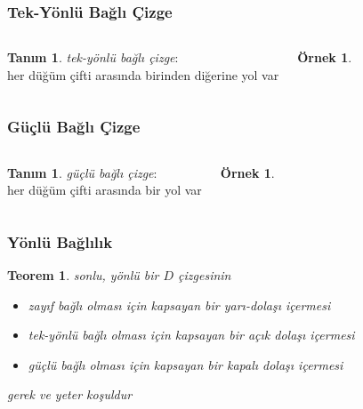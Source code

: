 \documentclass[dvipsnames]{beamer}
\theoremstyle{definition}
\newtheorem{tanim}[theorem]{Tanım}
\theoremstyle{example}
\newtheorem{ornek}[theorem]{Örnek}
\theoremstyle{plain}
\newtheorem{teorem}[theorem]{Teorem}
\begin{document}
\begin{frame}
  \frametitle{Tek-Yönlü Bağlı Çizge}

  \begin{columns}
    \begin{tanim}
      \emph{tek-yönlü bağlı çizge}:\\
      her düğüm çifti arasında birinden diğerine yol var
    \end{tanim}

    \begin{ornek}
      \begin{center}
      \end{center}
    \end{ornek}
  \end{columns}
\end{frame}

\begin{frame}
  \frametitle{Güçlü Bağlı Çizge}

  \begin{columns}
    \begin{tanim}
      \emph{güçlü bağlı çizge}:\\
      her düğüm çifti arasında bir yol var
    \end{tanim}

    \begin{ornek}
      \begin{center}
      \end{center}
    \end{ornek}
  \end{columns}
\end{frame}

\begin{frame}
  \frametitle{Yönlü Bağlılık}

  \begin{teorem}
    sonlu, yönlü bir $D$ çizgesinin

    \begin{itemize}
      \item zayıf bağlı olması için kapsayan bir yarı-dolaşı içermesi
      \item<2-> tek-yönlü bağlı olması için kapsayan bir açık dolaşı içermesi
      \item<3-> güçlü bağlı olması için kapsayan bir kapalı dolaşı içermesi
    \end{itemize}

    gerek ve yeter koşuldur
  \end{teorem}
\end{frame}
\end{document}
